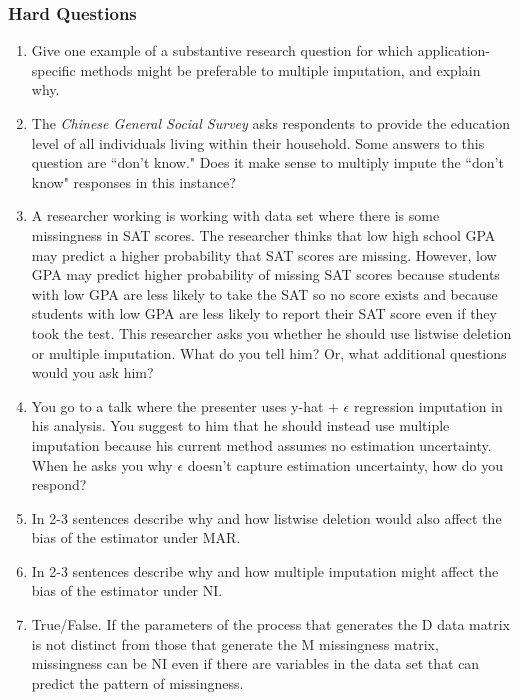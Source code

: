 \documentclass[11pt]{article}
\begin{document}
\subsubsection{Hard Questions}
\begin{enumerate}
\item Give one example of a substantive research question for which application-specific methods might be preferable to multiple imputation, and explain why. %
\item The \emph{Chinese General Social Survey} asks respondents to provide the education level of all individuals living within their household. Some answers to this question are ``don't know." Does it make sense to multiply impute the ``don't know" responses in this instance?
\item A researcher working is working with data set where there is some missingness in SAT scores. The researcher thinks that low high school GPA may predict a higher probability that SAT scores are missing. However, low GPA may predict higher probability of missing SAT scores because students with low GPA are less likely to take the SAT so no score exists and because students with low GPA are less likely to report their SAT score even if they took the test. This researcher asks you whether he should use listwise deletion or multiple imputation. What do you tell him? Or, what additional questions would you ask him?
\item You go to a talk where the presenter uses y-hat + $\epsilon$ regression imputation in his analysis. You suggest to him that he should instead use multiple imputation because his current method assumes no estimation uncertainty. When he asks you why $\epsilon$ doesn't capture estimation uncertainty, how do you respond?
\item In 2-3 sentences describe why and how listwise deletion would also affect the bias of the estimator under MAR.
\item In 2-3 sentences describe why and how multiple imputation might affect the bias of the estimator under NI.
\item True/False. If the parameters of the process that generates the D data matrix is not distinct from those that generate the M missingness matrix, missingness can be NI even if there are variables in the data set that can predict the pattern of missingness.
\end{enumerate}
\end{document}
